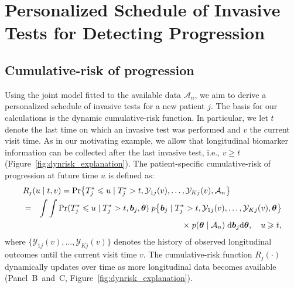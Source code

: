\section{Personalized Schedule of Invasive Tests for Detecting Progression} 
\label{sec:schedule}

\subsection{Cumulative-risk of progression} 
\label{subsec:cum_risk}

Using the joint model fitted to the available data $\mathcal A_n$, we aim to derive a personalized schedule of invasive tests for a new patient $j$. The basis for our calculations is the dynamic cumulative-risk function. In particular, we let $t$ denote the last time on which an invasive test was performed and $v$ the current visit time. As in our motivating example, we allow that longitudinal biomarker information can be collected after the last invasive test, i.e., $v \geq t$ (Figure~\ref{fig:dynrisk_explanation}). The patient-specific cumulative-risk of progression at future time $u$ is defined as:
\begin{eqnarray}
\label{eq:cumulative_risk}
\nonumber \lefteqn{R_j(u \mid t, v) = \mbox{Pr}\big\{T^*_j \leq u \mid T^*_j > t, \mathcal{Y}_{1j}(v), \ldots, \mathcal{Y}_{Kj}(v), \mathcal{A}_n\big\}}\\
\nonumber & = & \int \int \mbox{Pr}(T^*_j \leq u \mid T^*_j > t, \boldsymbol{b}_{j}, \boldsymbol{\theta}) \; p\big\{\boldsymbol{b}_j \mid T^*_j > t, \mathcal{Y}_{1j}(v), \ldots, \mathcal{Y}_{Kj}(v), \boldsymbol{\theta} \big\}\\
& & \quad \quad \times \; p(\boldsymbol{\theta} \mid \mathcal{A}_n) \; \mathrm{d}\boldsymbol{b}_j \mathrm{d}\boldsymbol{\theta}, \quad u \geq t,
\end{eqnarray}
where $\{\mathcal{Y}_{1j}(v), \ldots, \mathcal{Y}_{Kj}(v)\}$ denotes the history of observed longitudinal outcomes until the current visit time $v$. The cumulative-risk function $R_j(\cdot)$ dynamically updates over time as more longitudinal data becomes available (Panel~B~and~C, Figure~\ref{fig:dynrisk_explanation}).
